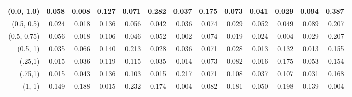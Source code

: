 \documentclass[11pt,fleqn]{article}
\begin{document}
{\begin{landscape}
\begin{table}[htbp]
\begin{tabular}{|r|rrrr|rrrr|rrrr|}
			(0.0, 1.0) & 0.058 & 0.008 & 0.127 & 0.071 & 0.282 & 0.037 & 0.175 & 0.073 & 0.041 & 0.029 & 0.094 & 0.387 \\
			\hline
			(0.5, 0.5) & 0.024 & 0.018 & 0.136 & 0.056 & 0.042 & 0.036 & 0.074 & 0.029 & 0.052 & 0.049 & 0.089 & 0.207 \\
			(0.5, 0.75) & 0.056 & 0.018 & 0.106 & 0.046 & 0.052 & 0.002 & 0.074 & 0.019 & 0.024 & 0.004 & 0.029 & 0.207 \\
			(0.5, 1) & 0.035 & 0.066 & 0.140 & 0.213 & 0.028 & 0.036 & 0.071 & 0.028 & 0.013 & 0.132 & 0.013 & 0.155 \\
			\hline
			(.25,1) & 0.015 & 0.036 & 0.119 & 0.115 & 0.035 & 0.014 & 0.073 & 0.082 & 0.016 & 0.175 & 0.053 & 0.154 \\
			(.75,1) & 0.015 & 0.043 & 0.136 & 0.103 & 0.015 & 0.217 & 0.071 & 0.108 & 0.037 & 0.107 & 0.031 & 0.168 \\
			(1, 1) & 0.149 & 0.188 & 0.015 & 0.232 & 0.174 & 0.004 & 0.082 & 0.181 & 0.050 & 0.198 & 0.139 & 0.004 \\
			\hline
		\end{tabular}
		\label{tab:2}
	\end{table}
	
	\newpage


\end{landscape}}
\end{document}
